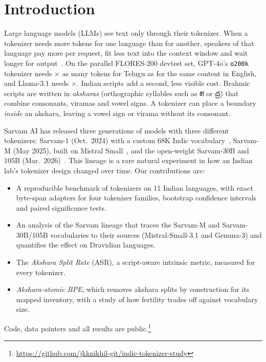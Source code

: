 \documentclass[conference]{IEEEtran}
\newcommand{\repo}{https://github.com/jkknikhil-git/indic-tokenizer-study}
\begin{document}
\section{Introduction}
Large language models (LLMs) see text only through their tokenizer. When a tokenizer needs more tokens for one language than for another, speakers of that language pay more per request, fit less text into the context window and wait longer for output~\cite{petrov2023unfairness,ahia-etal-2023-languages}. On the parallel FLORES-200 devtest set, GPT-4o's \texttt{o200k} tokenizer needs $\times$ as many tokens for Telugu as for the same content in English, and Llama-3.1 needs $\times$. Indian scripts add a second, less visible cost. Brahmic scripts are written in \emph{aksharas} (orthographic syllables such as {\deva क्ष} or {\telu ద్ర}) that combine consonants, viramas and vowel signs. A tokenizer can place a boundary \emph{inside} an akshara, leaving a vowel sign or virama without its consonant.

Sarvam AI has released three generations of models with three different tokenizers: Sarvam-1 (Oct.\ 2024) with a custom 68K Indic vocabulary~\cite{sarvam2024sarvam1}, Sarvam-M (May 2025), built on Mistral Small~\cite{sarvam2025sarvamm}, and the open-weight Sarvam-30B and 105B (Mar.\ 2026)~\cite{sarvam2026sarvam30b}. This lineage is a rare natural experiment in how an Indian lab's tokenizer design changed over time. Our contributions are:
\begin{itemize}
\item A reproducible benchmark of  tokenizers on 11 Indian languages, with exact byte-span adapters for four tokenizer families, bootstrap confidence intervals and paired significance tests.
\item An analysis of the Sarvam lineage that traces the Sarvam-M and Sarvam-30B/105B vocabularies to their sources (Mistral-Small-3.1 and Gemma-3) and quantifies the effect on Dravidian languages.
\item The \emph{Akshara Split Rate} (ASR), a script-aware intrinsic metric, measured for every tokenizer.
\item \emph{Akshara-atomic BPE}, which removes akshara splits by construction for its mapped inventory, with a study of how fertility trades off against vocabulary size.
\end{itemize}
Code, data pointers and all results are public.\footnote{\url{\repo}}
\end{document}
